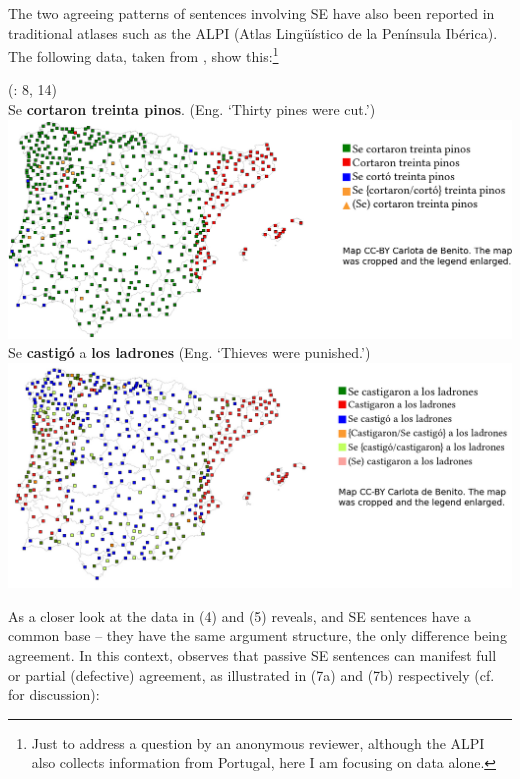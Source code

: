 \documentclass[output=paper]{langsci/langscibook}
\begin{document}
The two agreeing patterns of sentences involving SE have also been reported in traditional atlases such as the ALPI (Atlas Lingüístico de la Península Ibérica). The following data, taken from \citet{Benito2010}, show this:\footnote{Just to address a question by an anonymous reviewer, although the ALPI also collects information from Portugal, here I am focusing on  data alone.}\largerpage[1.5] 

\ea%
    (\citealt{Benito2010}: 8, 14)
    \label{ex:gallego:6}\\
    \ea Se \textbf{cortaron treinta pinos}. (Eng. ‘Thirty pines were cut.’)\\
          \includegraphics[width=\linewidth]{figures/pinos.png}
    \ex Se \textbf{castigó} a \textbf{los ladrones} (Eng. ‘Thieves were punished.’)\\
          \includegraphics[width=\linewidth]{figures/ladrones.png}
    \z
\z

As a closer look at the data in (4) and (5) reveals,  and  SE sentences have a common base – they have the same argument structure, the only difference being agreement. In this context, \citet[§26.3.2.2]{Mendikoetxea1999} observes that passive SE sentences can manifest full or partial (defective) agreement, as illustrated in (7a) and (7b) respectively (cf. \citealt{Martín1979} for discussion):
\end{document}
